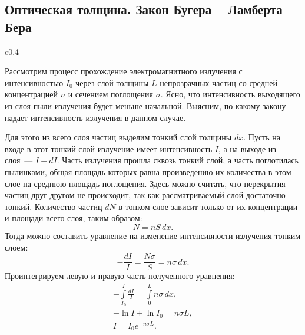 \subsection{Оптическая толщина. Закон Бугера -- Ламберта -- Бера}
\begin{wrapfigure}[10]{c}{0.4\tw}
	\centering
	\vspace{-1pc}
	\caption{}
	\label{}
\end{wrapfigure}
Рассмотрим процесс прохождение электромагнитного излучения с интенсивностью $I_0$ через слой толщины $L$ непрозрачных частиц со средней концентрацией $n$ и сечением поглощения $\sigma$. Ясно, что интенсивность выходящего из слоя пыли излучения будет меньше начальной. Выясним, по какому закону падает интенсивность излучения в данном случае.

Для этого из всего слоя частиц выделим тонкий слой толщины $dx$. Пусть на входе в этот тонкий слой излучение имеет интенсивность $I$, а на выходе из слоя~--- $I - dI$. Часть излучения прошла сквозь тонкий слой, а часть поглотилась пылинками, общая площадь которых равна произведению их количества в этом слое на среднюю площадь поглощения. Здесь можно считать, что перекрытия частиц друг другом не происходит, так как рассматриваемый слой достаточно тонкий. Количество частиц  $dN$ в тонком слое зависит только от их концентрации и площади всего слоя, таким образом:
\begin{equation*}
	N = n S \, dx.
\end{equation*}
Тогда можно составить уравнение на изменение интенсивности излучения тонким слоем:
\begin{equation*}
	-\frac{dI}{I} = \frac{N\sigma}{S} = n\sigma \, dx.
\end{equation*}
Проинтегрируем левую и правую часть полученного уравнения:
\begin{gather*}
	-\int\limits_{I_0}^{I} \frac{dI}{I} = \int\limits_{0}^{L} n \sigma \, dx,\\
	-\ln I + \ln I_0 = n\sigma L,\\[.5pc]
	I = I_0 e^{-n\sigma L}. \tag{\theequation}
\end{gather*}

